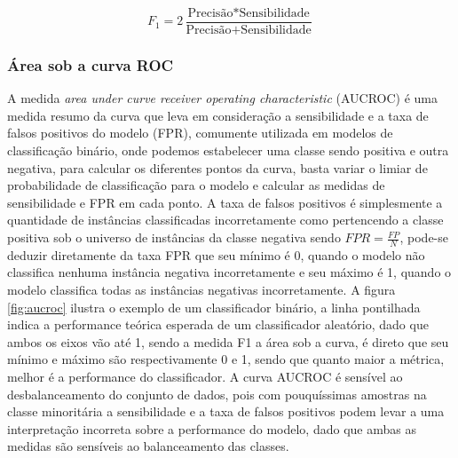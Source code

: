\begin{equation}
    F_{1} = 2\frac{\text{Precisão} * \text{Sensibilidade}}{\text{Precisão} + \text{Sensibilidade}}
\end{equation}

\subsubsection{Área sob a curva ROC}

A medida \textit{area under curve receiver operating characteristic} (AUCROC) é uma medida resumo da curva que leva em consideração a sensibilidade e a taxa de falsos positivos do modelo (FPR), comumente utilizada em modelos de classificação binário, onde podemos estabelecer uma classe sendo positiva e outra negativa, para calcular os diferentes pontos da curva, basta variar o limiar de probabilidade de classificação para o modelo e calcular as medidas de sensibilidade e FPR em cada ponto.
A taxa de falsos positivos é simplesmente a quantidade de instâncias classificadas incorretamente como pertencendo a classe positiva sob o universo de instâncias da classe negativa sendo $FPR = \frac{FP}{N}$, pode-se deduzir diretamente da taxa FPR que seu mínimo é 0, quando o modelo não classifica nenhuma instância negativa incorretamente e seu máximo é 1, quando o modelo classifica todas as instâncias negativas incorretamente. A figura \ref{fig:aucroc} ilustra o exemplo de um classificador binário, a linha pontilhada indica a performance teórica esperada de um classificador aleatório, dado que ambos os eixos vão até 1, sendo a medida F1 a área sob a curva, é direto que seu mínimo e máximo são respectivamente 0 e 1, sendo que quanto maior a métrica, melhor é a performance do classificador.
A curva AUCROC é sensível ao desbalanceamento do conjunto de dados, pois com pouquíssimas amostras na classe minoritária a sensibilidade e a taxa de falsos positivos podem levar a uma interpretação incorreta sobre a performance do modelo, dado que ambas as medidas são sensíveis ao balanceamento das classes.


